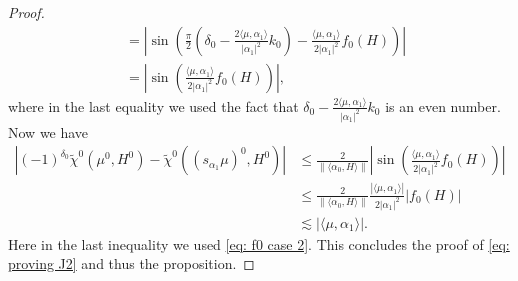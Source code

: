 \documentclass{amsart}
\numberwithin{equation}{section}
\numberwithin{equation}{section}
\begin{document}
\begin{proof}
\begin{align*}
   &=\left|\sin\left(\frac{\pi}{2}\left({\delta_0}-\frac{2\langle\mu,\alpha_1\rangle}{|\alpha_1|^2}k_0\right)-\frac{\langle\mu,\alpha_1\rangle}{2|\alpha_1|^2}f_0(H)\right)\right|\\
   &=\left|\sin\left(\frac{\langle\mu,\alpha_1\rangle}{2|\alpha_1|^2}f_0(H)\right)\right|,
\end{align*}
where in the last equality we used the fact that ${\delta_0}-\frac{2\langle\mu,\alpha_1\rangle}{|\alpha_1|^2}k_0$ is an even number.
Now we have  
\begin{align*}
 \left|(-1)^{\delta_0}\widetilde{\chi}^0({\mu^0}, H^0)-\widetilde{\chi}^0({(s_{\alpha_1}\mu)^0}, H^0)\right|
 &\leq \frac2{\|\langle\alpha_0,H\rangle\|}\left|\sin\left(\frac{\langle\mu,\alpha_1\rangle}{2|\alpha_1|^2}f_0(H)\right)\right|\\
 &\leq\frac2{\|\langle\alpha_0,H\rangle\|} \frac{|\langle\mu,\alpha_1\rangle|}{2|\alpha_1|^2}|f_0(H)|\\
 &\lesssim  |\langle\mu,\alpha_1\rangle|.
\end{align*}
Here in the last inequality we used \eqref{eq: f0 case 2}. 
This concludes the proof of \eqref{eq: proving J2} and thus the proposition. 
    \end{proof}
\end{document}
